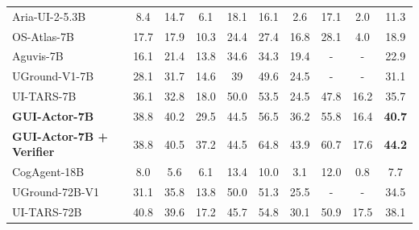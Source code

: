 \begin{table}[!t]
{\begin{tabular}{lccccccccc}
Aria-UI-2-5.3B & 8.4 & 14.7 & 6.1 & 18.1 & 16.1 & 2.6 & 17.1 & 2.0 & \cellcolor{lightblue}11.3 \\
OS-Atlas-7B & 17.7 & 17.9 & 10.3 & 24.4 & 27.4 & 16.8 & 28.1 & 4.0 & \cellcolor{lightblue}18.9 \\
Aguvis-7B & 16.1 & 21.4 & 13.8 & 34.6 & 34.3 & 19.4 & - & - & \cellcolor{lightblue}22.9 \\
UGround-V1-7B & 28.1 & 31.7 & 14.6 & 39 & 49.6 & 24.5 & - & - & \cellcolor{lightblue}31.1 \\
UI-TARS-7B & 36.1 & 32.8 & 18.0 & 50.0 & 53.5 & 24.5 & 47.8 & 16.2 & \cellcolor{lightblue}35.7 \\
\cellcolor{lightblue}\textbf{GUI-Actor-7B} & \cellcolor{lightblue}38.8 & \cellcolor{lightblue}40.2 & \cellcolor{lightblue}29.5 & \cellcolor{lightblue}44.5 & \cellcolor{lightblue}56.5 & \cellcolor{lightblue}36.2 & \cellcolor{lightblue}55.8 & \cellcolor{lightblue}16.4 & \cellcolor{lightblue}\textbf{40.7} \\
\cellcolor{lightblue}\textbf{GUI-Actor-7B + Verifier} & \cellcolor{lightblue}38.8 & \cellcolor{lightblue}40.5 & \cellcolor{lightblue}37.2 & \cellcolor{lightblue}44.5 & \cellcolor{lightblue}64.8 & \cellcolor{lightblue}43.9 & \cellcolor{lightblue}60.7 & \cellcolor{lightblue}17.6 & \cellcolor{lightblue}\textbf{44.2} \\
\midrule
CogAgent-18B & 8.0 & 5.6 & 6.1 & 13.4 & 10.0 & 3.1 & 12.0 & 0.8 & \cellcolor{lightblue}7.7 \\
UGround-72B-V1 & 31.1 & 35.8 & 13.8 & 50.0 & 51.3 & 25.5 & - & - & \cellcolor{lightblue}34.5 \\
UI-TARS-72B & 40.8 & 39.6 & 17.2 & 45.7 & 54.8 & 30.1 & 50.9 & 17.5 & \cellcolor{lightblue}38.1 \\
\bottomrule
\end{tabular}

}
\label{tab:screenspot_pro}
\end{table}

